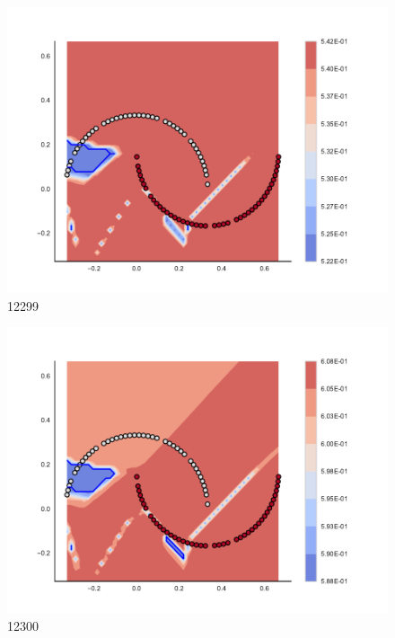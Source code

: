 \begin{subfigure}[b]{0.09\textwidth}
    \includegraphics[clip, trim=2.35cm 1.75cm 4.5cm 0cm,width=\textwidth]{img/convergence/12299.pdf}
    \caption{12299}
    \label{fig:convergence_12299}
\end{subfigure}
%
\begin{subfigure}[b]{0.09\textwidth}
    \includegraphics[clip, trim=2.35cm 1.75cm 4.5cm 0cm,width=\textwidth]{img/convergence/12300.pdf}
    \caption{12300}
    \label{fig:convergence_12300}
\end{subfigure}
%
